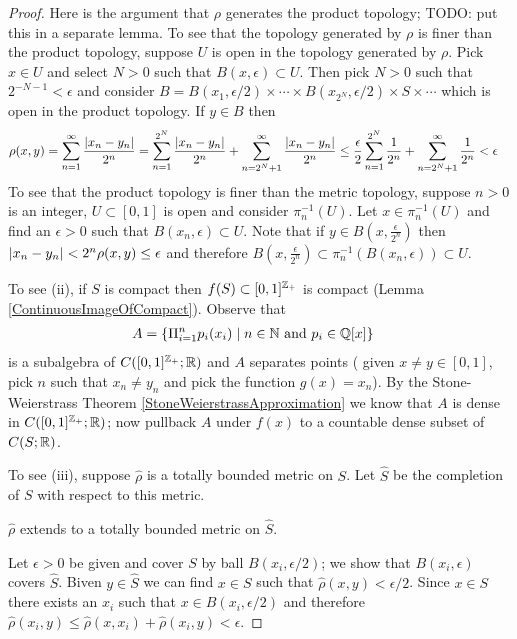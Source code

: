 \begin{proof}
Here is the argument that $\rho$ generates the product topology; TODO:
put this in a separate lemma.  To see that the topology generated by
$\rho$ is finer than the product topology, suppose $U$ is open in the
topology generated by $\rho$.  Pick $x \in U$ and select $N > 0$ such
that $B(x,\epsilon) \subset U$.  Then pick $N > 0$ such that $2^{-N-1} <
\epsilon$ and consider $B=B(x_1, \epsilon/2)
\times \dotsb \times B(x_{2^N}, \epsilon/2) \times S \times \dotsb$
which is open in the product topology.  If $y \in B$ then 
\begin{align*}
\rho(x,y) &=
\sum_{n=1}^\infty \frac{\left \vert x_n-y_n \right \vert}{2^n} = \sum_{n=1}^{2^N}
\frac{\left \vert x_n-y_n \right \vert}{2^n} + \sum_{n=2^N+1}^\infty \frac{\left \vert x_n-y_n \right \vert}{2^n} \leq
\frac{\epsilon}{2} \sum_{n=1}^{2^N} \frac{1}{2^n} +
\sum_{n=2^N+1}^\infty \frac{1}{2^n} < \epsilon
\end{align*}
To see that the product topology is finer than the metric topology,
suppose $n >0$ is an integer, $U\subset[0,1]$ is open and consider $\pi_n^{-1}(U)$.  Let $x
\in \pi_n^{-1}(U)$ and find an $\epsilon > 0$ such that $B(x_n,
\epsilon) \subset U$.  Note that if $y \in B(x, \frac{\epsilon}{2^n})$
then $\left \vert x_n - y_n \right \vert < 2^n \rho(x,y) \leq \epsilon$ and therefore
$B(x, \frac{\epsilon}{2^n}) \subset \pi_n^{-1}(B(x_n, \epsilon))
\subset U$.

To see (ii), if $S$ is compact then $f(S) \subset [0,1]^{\mathbb{Z}_+}$
is compact (Lemma \ref{ContinuousImageOfCompact}).  Observe that 
\begin{align*}
A &= \lbrace \Pi_{i=1}^np_i(x_i) \mid n \in \mathbb{N} \text{ and } p_i
\in \mathbb{Q}[x] \rbrace
\end{align*}
is a subalgebra of $C([0,1]^{\mathbb{Z}_+} ; \mathbb{R})$ and $A$ separates points (
given $x \neq y \in [0,1]$, pick
$n$ such that $x_n \neq y_n$ and pick the function $g(x) = x_n$).  By
the Stone-Weierstrass Theorem \ref{StoneWeierstrassApproximation} we know that $A$ is dense in $C([0,1]^{\mathbb{Z}_+};
\mathbb{R})$; now pullback $A$ under $f(x)$ to a countable dense subset of
$C(S;\mathbb{R})$. 

To see (iii), suppose $\hat{\rho}$ is a totally bounded metric on
$S$.  Let $\hat{S}$ be the completion of $S$ with respect to
this metric.  

\begin{clm}$\hat{\rho}$ extends to a totally bounded
metric on $\hat{S}$.  
\end{clm}

Let $\epsilon>0$ be given and cover $S$ by ball
$B(x_i, \epsilon/2)$; we show that $B(x_i, \epsilon)$ covers
$\hat{S}$.  Biven $y \in \hat{S}$ we can find $x \in
S$ such that $\hat{\rho}(x,y) < \epsilon/2$.  Since $x \in S$ there
exists an $x_i$ such that $x \in B(x_i, \epsilon/2)$ and therefore
$\hat{\rho}(x_i,y) \leq \hat{\rho}(x,x_i) + \hat{\rho}(x_i,y) <
\epsilon$.


\end{proof}
